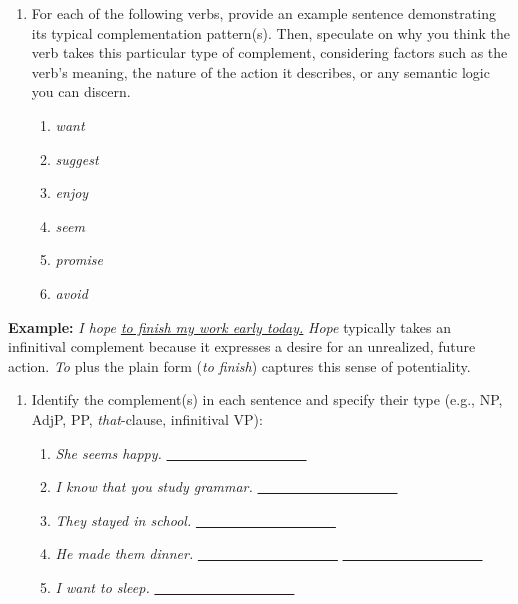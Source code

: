 \begin{tcolorbox}[title=Exercise: Verb Complementation Patterns, colback=white, colframe=red!75!black, fonttitle=\bfseries]

\begin{enumerate}[nosep]
\item For each of the following verbs, provide an example sentence demonstrating its typical complementation pattern(s). Then, speculate on why you think the verb takes this particular type of complement, considering factors such as the verb's meaning, the nature of the action it describes, or any semantic logic you can discern.

\begin{enumerate}[nosep]
    \item \textit{want}
    \item \textit{suggest}
    \item \textit{enjoy}
    \item \textit{seem}
    \item \textit{promise}
    \item \textit{avoid}
\end{enumerate}
\end{enumerate}

\noindent \textbf{Example:} \textit{I hope \uline{to finish my work early today.}} 
\textit{Hope} typically takes an infinitival complement because it expresses a desire for an unrealized, future action. \textit{To} plus the plain form (\textit{to finish}) captures this sense of potentiality.

\begin{enumerate}[nosep]

\item Identify the complement(s) in each sentence and specify their type (e.g., NP, AdjP, PP, \textit{that}-clause, infinitival VP):

   \begin{enumerate}[nosep]
   \item \textit{She seems happy.} \hfill\uline{~~~~~~~~~~~~~~~~~~~~} 
   \item \textit{I know that you study grammar.} \hfill\uline{~~~~~~~~~~~~~~~~~~~~}
   \item \textit{They stayed in school.} \hfill\uline{~~~~~~~~~~~~~~~~~~~~}
   \item \textit{He made them dinner.} \hfill\uline{~~~~~~~~~~~~~~~~~~~~} \uline{~~~~~~~~~~~~~~~~~~~~}
   \item \textit{I want to sleep.} \hfill\uline{~~~~~~~~~~~~~~~~~~~~}
   \end{enumerate}


\end{enumerate}
\end{tcolorbox}
